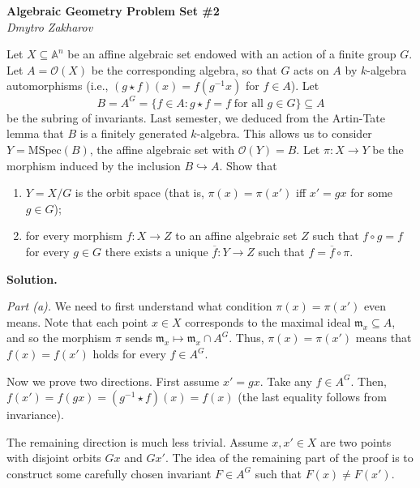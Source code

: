 \documentclass{template}
\begin{document}
\begin{center}
    \Large \textcolor{blue!70!black}{\textbf{Algebraic Geometry Problem Set \#2}} \\
    \normalsize \textit{Dmytro Zakharov}
\end{center}

\begin{problem}[Exercise 1]
    Let $X \subseteq \mathbb{A}^n$ be an affine algebraic set endowed with an
    action of a finite group $G$. Let $A = \mathcal{O}(X)$ be the corresponding
    algebra, so that $G$ acts on $A$ by $k$-algebra automorphisms (i.e., $(g \star
    f)(x) = f(g^{-1}x)$ for $f \in A$). Let 
    \begin{equation*}
        B = A^G = \{f \in A: g \star f = f \; \text{for all $g \in G$}\} \subseteq A
    \end{equation*}
    be the subring of invariants. Last semester, we deduced from the Artin-Tate
    lemma that $B$ is a finitely generated $k$-algebra. This allows us to
    consider $Y=\text{MSpec}(B)$, the affine algebraic set with
    $\mathcal{O}(Y)=B$. Let $\pi: X \to Y$ be the morphism induced by the
    inclusion $B \hookrightarrow A$. Show that
    \begin{enumerate}
        \item[(a)] $Y=X/G$ is the orbit space (that is, $\pi(x)=\pi(x')$ iff $x'=gx$ for some $g \in G$);
        \item[(b)] for every morphism $f: X \to Z$ to an affine algebraic set $Z$ such 
        that $f \circ g = f$ for every $g \in G$ there exists a unique $\overline{f}: Y \to Z$
        such that $f = \overline{f} \circ \pi$. 
    \end{enumerate}
\end{problem}

\textbf{Solution.} 

\textcolor{blue!70!black}{\textit{Part (a).}} We need to first understand what
condition $\pi(x)=\pi(x')$ even means. Note that each point $x \in X$
corresponds to the maximal ideal $\mathfrak{m}_x \subseteq A$, and so the
morphism $\pi$ sends $\mathfrak{m}_x \mapsto \mathfrak{m}_x \cap A^G$. Thus,
$\pi(x)=\pi(x')$ means that $f(x)=f(x')$ holds for every $f \in A^G$.

Now we prove two directions. First assume $x'=gx$. Take any $f \in A^G$. Then,
$f(x') = f(gx) = (g^{-1} \star f)(x) = f(x)$ (the last equality follows from
invariance). 

The remaining direction is much less trivial. Assume $x,x' \in X$ are two points
with disjoint orbits $Gx$ and $Gx'$. The idea of the remaining part of the proof
is to construct some carefully chosen invariant $F \in A^G$ such that $F(x) \neq
F(x')$.
\end{document}
